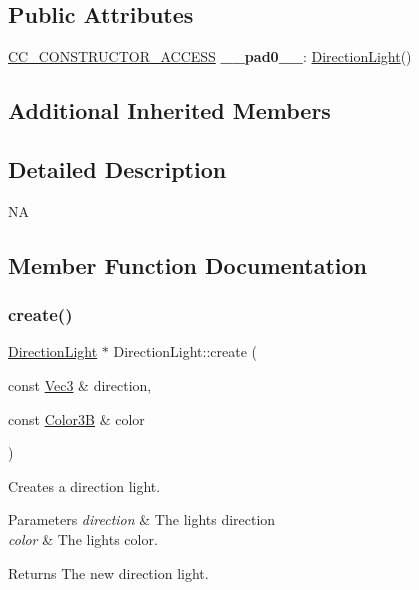 \subsection*{Public Attributes}
\begin{DoxyCompactItemize}
\item 
\mbox{\label{classDirectionLight_ac490b489fde09e254fc4b0b3c9ad4c36}} 
\hyperlink{_2cocos2d_2cocos_2base_2ccConfig_8h_a25ef1314f97c35a2ed3d029b0ead6da0}{C\+C\+\_\+\+C\+O\+N\+S\+T\+R\+U\+C\+T\+O\+R\+\_\+\+A\+C\+C\+E\+SS} {\bfseries \+\_\+\+\_\+pad0\+\_\+\+\_\+}\+: \hyperlink{classDirectionLight}{Direction\+Light}()
\end{DoxyCompactItemize}
\subsection*{Additional Inherited Members}


\subsection{Detailed Description}
NA 

\subsection{Member Function Documentation}
\mbox{\label{classDirectionLight_a6d3a57b3058009beaaa2b454e3c32a06}} 
\subsubsection{\texorpdfstring{create()}{create()}\hspace{0.1cm}{\footnotesize\ttfamily [1/2]}}
{\footnotesize\ttfamily \hyperlink{classDirectionLight}{Direction\+Light} $\ast$ Direction\+Light\+::create (\begin{DoxyParamCaption}\item[{const \hyperlink{classVec3}{Vec3} \&}]{direction,  }\item[{const \hyperlink{structColor3B}{Color3B} \&}]{color }\end{DoxyParamCaption})\hspace{0.3cm}{\ttfamily [static]}}

Creates a direction light. 
\begin{DoxyParams}{Parameters}
{\em direction} & The light\textquotesingle{}s direction \\
\hline
{\em color} & The light\textquotesingle{}s color.\\
\hline
\end{DoxyParams}
\begin{DoxyReturn}{Returns}
The new direction light. 
\end{DoxyReturn}
\mbox{\label{classDirectionLight_a8a5ea047ba6cb79f57acdeb76b1d5725}} 
